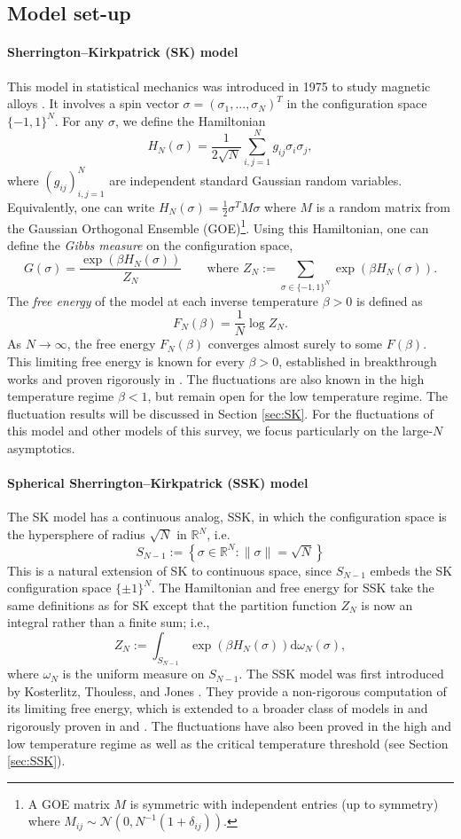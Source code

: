 \documentclass[11pt]{article}
\numberwithin{equation}{section}
\newcommand{\beqq}{ \begin{equation*} }
\newcommand{\eeqq}{ \end{equation*} }
\def \dd {\mathrm{d}}
\def \b {\beta}
\def \s {\sigma}
\def \RR {\mathbb{R}}
\def \cN {\mathcal{N}}
\theoremstyle{remark}
\begin{document}
\subsection{Model set-up}
\paragraph{Sherrington--Kirkpatrick (SK) model} This model in statistical mechanics was introduced in 1975 to study magnetic alloys \cite{SherringtonKirkpatrick1975}.  It involves a spin vector $\s=(\s_1,...,\s_N)^T$ in the configuration space $\{-1,1\}^N$.  For any $\s$, we define the Hamiltonian
\beqq
H_N(\s)=\frac1{2\sqrt N}\sum_{i,j=1}^N g_{ij}\s_i\s_j,
\eeqq
where $(g_{ij})_{i,j=1}^N$ are independent standard Gaussian random variables. Equivalently, one can write $H_N(\s)=\frac12\s^TM\s$ where $M$ is a random matrix from the Gaussian Orthogonal Ensemble (GOE)\footnote{A GOE matrix $M$ is symmetric with independent entries (up to symmetry) where $M_{ij} \sim \cN(0,N^{-1}(1+\delta_{ij})).$}.  Using this Hamiltonian, one can define the \textit{Gibbs measure} on the configuration space, 
\[G(\s)=\frac{\exp(\b H_N(\s))}{Z_N}\qquad \text{where }Z_N:=\sum_{\s \in \{-1,1\}^N} \exp\left(\b H_N(\s)\right). \]
The \textit{free energy} of the model at each inverse temperature $\b>0$ is defined as 
\beqq
F_N(\b) = \frac1N\log Z_N.
\eeqq
As $N\to\infty$, the free energy $F_N(\b)$ converges almost surely to some $F(\b)$.  This limiting free energy is known for every $\b>0$, established in breakthrough works \cite{Parisi1979, Parisi1980} and proven rigorously in \cite{Guerra03, TalagrandSK, Panchenk14}.  The fluctuations are also known in the high temperature regime $\b<1$, but remain open for the low temperature regime.  The fluctuation results will be discussed in Section \ref{sec:SK}. For the fluctuations of this model and other models of this survey, we focus particularly on the large-$N$ asymptotics.

\paragraph{Spherical Sherrington--Kirkpatrick (SSK) model} The SK model has a continuous analog, SSK, in which the configuration space is the hypersphere of radius $\sqrt{N}$ in $\RR^N$, i.e.
\[
S_{N-1}:=\left\{\s\in\RR^N:\|\s\|=\sqrt{N}\right\}
\]
This is a natural extension of SK to continuous space, since $S_{N-1}$  embeds the SK configuration space $\{\pm1\}^N$.  The Hamiltonian and free energy for SSK take the same definitions as for SK except that the partition function $Z_N$ is now an integral rather than a finite sum; i.e.,
\[
Z_N:=\int_{S_{N-1}}\exp\left(\b H_N(\s)\right)\dd\omega_N(\s),
\]
where $\omega_N$ is the uniform measure on $S_{N-1}$.  The SSK model was first introduced by Kosterlitz, Thouless, and Jones \cite{kosterlitz1976spherical}. They provide a non-rigorous computation of its limiting free energy, which is extended to a broader class of models in \cite{crisanti1992sphericalp} and rigorously proven in \cite{TalagrandSSK} and \cite{Chen13}.  The fluctuations have also been proved in the high and low temperature regime as well as the critical temperature threshold (see Section \ref{sec:SSK}).
\end{document}
